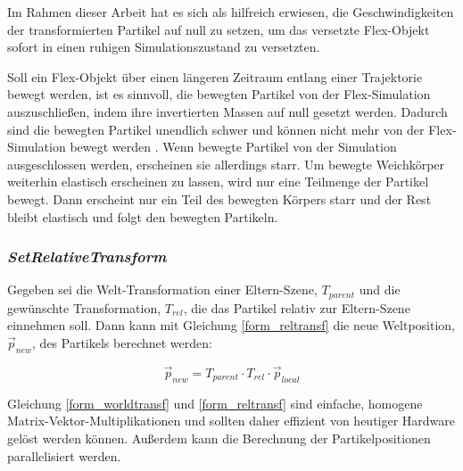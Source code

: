 Im Rahmen dieser Arbeit hat es sich als hilfreich erwiesen, die Geschwindigkeiten der transformierten Partikel auf null zu setzen, um das versetzte Flex-Objekt sofort in einen ruhigen Simulationszustand zu versetzten. 

Soll ein Flex-Objekt  über einen längeren Zeitraum entlang einer Trajektorie bewegt werden, ist es sinnvoll, die bewegten Partikel von der Flex-Simulation auszuschließen, indem ihre invertierten Massen auf null gesetzt werden. Dadurch sind die bewegten Partikel unendlich schwer und können nicht mehr von der Flex-Simulation bewegt werden \cite{PBD}. Wenn bewegte Partikel von der Simulation ausgeschlossen werden, erscheinen sie allerdings starr. Um bewegte Weichkörper weiterhin elastisch erscheinen zu lassen, wird nur eine Teilmenge der Partikel bewegt. Dann erscheint nur ein Teil des bewegten Körpers starr und der Rest bleibt elastisch und folgt den bewegten Partikeln.

\subsubsection{\textit{SetRelativeTransform}}
\label{subsubsec_reltrans}


Gegeben sei die Welt-Transformation einer Eltern-Szene, $T_{parent}$ und die gewünschte Transformation, $T_{rel}$, die das Partikel relativ zur Eltern-Szene einnehmen soll.
Dann kann mit Gleichung \ref{form_reltransf} die neue Weltposition, $\vec{p}_{new}$, des Partikels berechnet werden:

\begin{equation}
\vec{p}_{new} = T_{parent} \cdot T_{rel} \cdot \vec{p}_{local}
\label{form_reltransf}
\end{equation}

Gleichung \ref{form_worldtransf} und \ref{form_reltransf} sind einfache, homogene Matrix-Vektor-Multiplikationen und sollten daher effizient von heutiger Hardware gelöst werden können. Außerdem kann die Berechnung der Partikelpositionen parallelisiert werden.


